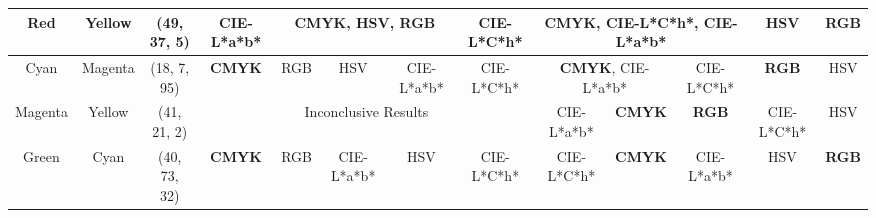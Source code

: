 \begin{table}[htbp]
{\begin{tabular}{@{}ccclcccccccccc@{}}
    Red                     & \multicolumn{1}{c|}{Yellow}                    & \multicolumn{2}{c|}{\cellcolor[HTML]{FF8000}(49, 37, 5)}   & \multicolumn{1}{c|}{CIE-L*a*b*}                            & \multicolumn{3}{c|}{\textbf{CMYK}, HSV, RGB}                                                           & \multicolumn{1}{c|}{CIE-L*C*h*} & \multicolumn{3}{c|}{\textbf{CMYK}, CIE-L*C*h*, CIE-L*a*b*}                                                                                                      & \multicolumn{1}{c|}{HSV}                          & \multicolumn{1}{c|}{\textbf{RGB}}                 \\ \midrule
    Cyan                    & \multicolumn{1}{c|}{Magenta}                   & \multicolumn{2}{c|}{\cellcolor[HTML]{0000FF}(18, 7, 95)}   & \multicolumn{1}{c|}{\textbf{CMYK}}                                  & \multicolumn{1}{c|}{RGB}           & \multicolumn{1}{c|}{HSV}        & \multicolumn{1}{c|}{CIE-L*a*b*} & \multicolumn{1}{c|}{CIE-L*C*h*} & \multicolumn{2}{c|}{\textbf{CMYK}, CIE-L*a*b*}                                                              & \multicolumn{1}{c|}{CIE-L*C*h*}                   & \multicolumn{1}{c|}{\textbf{RGB}}                 & \multicolumn{1}{c|}{HSV}                          \\ \midrule
    Magenta                 & \multicolumn{1}{c|}{Yellow}                    & \multicolumn{2}{c|}{\cellcolor[HTML]{FF0000}(41, 21, 2)}   & \multicolumn{5}{c|}{Inconclusive Results}                                                                                                                                                             & \multicolumn{1}{c|}{CIE-L*a*b*}                      & \multicolumn{1}{c|}{\textbf{CMYK}}                   & \multicolumn{1}{c|}{\textbf{RGB}}                 & \multicolumn{1}{c|}{CIE-L*C*h*}                   & \multicolumn{1}{c|}{HSV}                          \\ \midrule
    Green                   & \multicolumn{1}{c|}{Cyan}                      & \multicolumn{2}{c|}{\cellcolor[HTML]{00FF80}(40, 73, 32)}  & \multicolumn{1}{c|}{\textbf{CMYK}}                         & \multicolumn{1}{c|}{RGB}           & \multicolumn{1}{c|}{CIE-L*a*b*} & \multicolumn{1}{c|}{HSV}        & \multicolumn{1}{c|}{CIE-L*C*h*} & \multicolumn{1}{c|}{CIE-L*C*h*}                      & \multicolumn{1}{c|}{\textbf{CMYK}}                   & \multicolumn{1}{c|}{CIE-L*a*b*}                   & \multicolumn{1}{c|}{HSV}                          & \multicolumn{1}{c|}{\textbf{RGB}}                 \\ \midrule

\end{tabular}}
\end{table}
